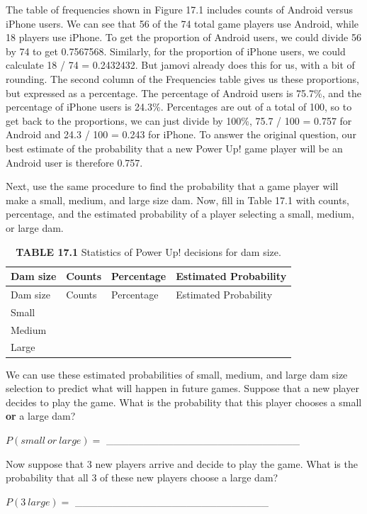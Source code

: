 \documentclass[
  openany]{krantz}
\begin{document}
The table of frequencies shown in Figure 17.1 includes counts of Android versus iPhone users.
We can see that 56 of the 74 total game players use Android, while 18 players use iPhone.
To get the proportion of Android users, we could divide 56 by 74 to get 0.7567568.
Similarly, for the proportion of iPhone users, we could calculate 18 / 74 = 0.2432432.
But jamovi already does this for us, with a bit of rounding.
The second column of the Frequencies table gives us these proportions, but expressed as a percentage.
The percentage of Android users is 75.7\%, and the percentage of iPhone users is 24.3\%.
Percentages are out of a total of 100, so to get back to the proportions, we can just divide by 100\%, 75.7 / 100 = 0.757 for Android and 24.3 / 100 = 0.243 for iPhone.
To answer the original question, our best estimate of the probability that a new Power Up! game player will be an Android user is therefore 0.757.

Next, use the same procedure to find the probability that a game player will make a small, medium, and large size dam.
Now, fill in Table 17.1 with counts, percentage, and the estimated probability of a player selecting a small, medium, or large dam.

\begin{longtable}[]{@{}llll@{}}
\caption{\textbf{TABLE 17.1} Statistics of Power Up! decisions for dam size.}\tabularnewline
\toprule
Dam size & Counts & Percentage & Estimated Probability \\
\midrule
\endfirsthead
\toprule
Dam size & Counts & Percentage & Estimated Probability \\
\midrule
\endhead
Small & & & \\
Medium & & & \\
Large & & & \\
\bottomrule
\end{longtable}

We can use these estimated probabilities of small, medium, and large dam size selection to predict what will happen in future games.
Suppose that a new player decides to play the game.
What is the probability that this player chooses a small \textbf{or} a large dam?

\(P(small\:or\:large) =\) \_\_\_\_\_\_\_\_\_\_\_\_\_\_\_\_\_\_\_\_\_\_\_\_\_\_

Now suppose that 3 new players arrive and decide to play the game.
What is the probability that all 3 of these new players choose a large dam?

\(P(3\:large) =\) \_\_\_\_\_\_\_\_\_\_\_\_\_\_\_\_\_\_\_\_\_\_\_\_\_\_
\end{document}
